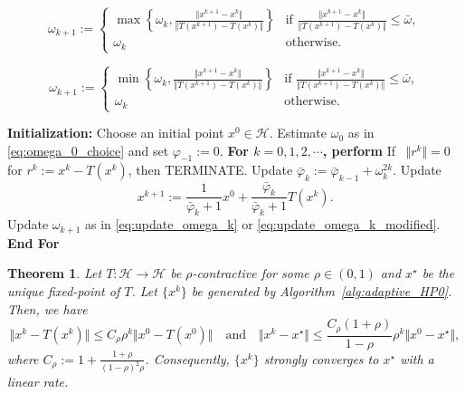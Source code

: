 \documentclass[10pt,a4paper]{amsart}
\newtheorem{theorem}{Theorem}
\newcommand{\Hil}{\mathcal{H}}
\newcommand{\norms}[1]{\Vert#1\Vert}
\newcommand{\set}[1]{\left\{#1\right\}}
\newcommand{\sets}[1]{\{#1\}}
\begin{document}
\begin{equation}\label{eq:update_omega_k}
\omega_{k+1} := \begin{cases}
\max\set{ \omega_k, \frac{\norms{x^{k+1} - x^k } }{ \norms{T(x^{k+1}) - T(x^{k})} } } & \textrm{if $\frac{\norms{x^{k+1} - x^k } }{ \norms{T(x^{k+1}) - T(x^{k})} } \leq \bar{\omega}$}, \\
\omega_k & \textrm{otherwise}.
\end{cases}
\end{equation}

\begin{equation}\label{eq:update_omega_k_modified}
\omega_{k+1} := \begin{cases}
\min\set{ \omega_k, \frac{\norms{x^{k+1} - x^k } }{ \norms{T(x^{k+1}) - T(x^{k})} } } & \textrm{if $\frac{\norms{x^{k+1} - x^k } }{ \norms{T(x^{k+1}) - T(x^{k})} } \leq \bar{\omega}$}, \\
\omega_k & \textrm{otherwise}.
\end{cases}
\end{equation}

\begin{algorithm}[!htbp]
\caption{(Parameter-Free Halpern Fixed-Point Algorithm)}\label{alg:adaptive_HP0}
\begin{algorithmic}[1]
\State\textbf{Initialization:} Choose an initial point $x^0\in\mathcal H$.
Estimate $\omega_0$ as in \eqref{eq:omega_0_choice} and set $\varphi_{-1} := 0$.
\State \textbf{For $k = 0, 1, 2, \cdots$, perform}
\State\hspace{3ex}\label{alg1:step3}If ~$\norms{r^k} = 0$ for $r^k := x^k - T(x^k)$,  then TERMINATE.
\State\hspace{3ex}Update $\bar{\varphi}_{k} := \bar{\varphi}_{k-1} + \omega_k^{2k}$.
\State\hspace{3ex}\label{alg1:step5}Update
\begin{equation*}
x^{k+1} :=  \frac{1}{ \bar{\varphi}_k + 1} x^0 + \frac{ \bar{\varphi}_k}{\bar{\varphi}_k + 1}T(x^k).
\end{equation*}
\State\hspace{3ex}\label{alg1:step6}Update $\omega_{k+1}$ as in \eqref{eq:update_omega_k} or \eqref{eq:update_omega_k_modified}.
\State\textbf{End For}
\end{algorithmic}
\end{algorithm}

\begin{theorem}\label{th:convergence_theorem1}
Let $T : \Hil \to \Hil$ be $\rho$-contractive for some $\rho \in (0, 1)$ and $x^{\star}$ be the unique fixed-point of $T$.
Let $\sets{x^k}$ be generated by Algorithm~\ref{alg:adaptive_HP0}.
Then, we have
\begin{equation}\label{eq:convergence_bound1}
\norms{x^k - T(x^k)} \leq  C_{\rho} \rho^k \norms{x^0 - T(x^0)} \quad \textrm{and} \quad \norms{x^k - x^{\star}} \leq \frac{C_{\rho}(1+\rho)}{1-\rho} \rho^k \norms{x^0 - x^{\star}},
\end{equation}
where $C_{\rho} := 1 + \frac{1+\rho}{(1-\rho)^2\rho}$.
Consequently, $\sets{x^k}$ strongly converges to $x^{\star}$ with a linear rate.
\end{theorem}
\end{document}
